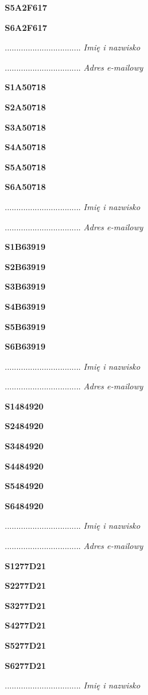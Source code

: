 \Large \textbf{S5A2F617}

\Large \textbf{S6A2F617}

.................................
\textit{Imię i nazwisko}

.................................
\textit{Adres e-mailowy}

\Large \textbf{S1A50718}

\Large \textbf{S2A50718}

\Large \textbf{S3A50718}

\Large \textbf{S4A50718}

\Large \textbf{S5A50718}

\Large \textbf{S6A50718}

.................................
\textit{Imię i nazwisko}

.................................
\textit{Adres e-mailowy}

\Large \textbf{S1B63919}

\Large \textbf{S2B63919}

\Large \textbf{S3B63919}

\Large \textbf{S4B63919}

\Large \textbf{S5B63919}

\Large \textbf{S6B63919}

.................................
\textit{Imię i nazwisko}

.................................
\textit{Adres e-mailowy}

\Large \textbf{S1484920}

\Large \textbf{S2484920}

\Large \textbf{S3484920}

\Large \textbf{S4484920}

\Large \textbf{S5484920}

\Large \textbf{S6484920}

.................................
\textit{Imię i nazwisko}

.................................
\textit{Adres e-mailowy}

\Large \textbf{S1277D21}

\Large \textbf{S2277D21}

\Large \textbf{S3277D21}

\Large \textbf{S4277D21}

\Large \textbf{S5277D21}

\Large \textbf{S6277D21}

.................................
\textit{Imię i nazwisko}

